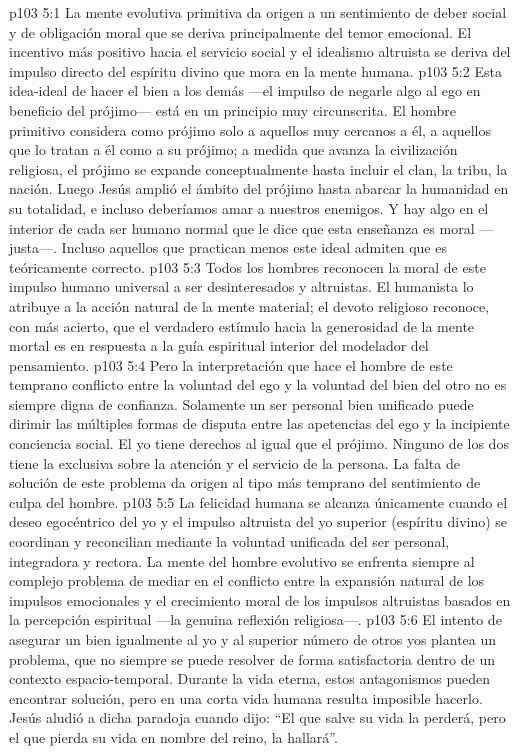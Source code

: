 \vs p103 5:1 La mente evolutiva primitiva da origen a un sentimiento de deber social y de obligación moral que se deriva principalmente del temor emocional. El incentivo más positivo hacia el servicio social y el idealismo altruista se deriva del impulso directo del espíritu divino que mora en la mente humana.
\vs p103 5:2 Esta idea\hyp{}ideal de hacer el bien a los demás ---el impulso de negarle algo al ego en beneficio del prójimo--- está en un principio muy circunscrita. El hombre primitivo considera como prójimo solo a aquellos muy cercanos a él, a aquellos que lo tratan a él como a su prójimo; a medida que avanza la civilización religiosa, el prójimo se expande conceptualmente hasta incluir el clan, la tribu, la nación. Luego Jesús amplió el ámbito del prójimo hasta abarcar la humanidad en su totalidad, e incluso deberíamos amar a nuestros enemigos. Y hay algo en el interior de cada ser humano normal que le dice que esta enseñanza es moral ---justa---. Incluso aquellos que practican menos este ideal admiten que es teóricamente correcto.
\vs p103 5:3 Todos los hombres reconocen la moral de este impulso humano universal a ser desinteresados y altruistas. El humanista lo atribuye a la acción natural de la mente material; el devoto religioso reconoce, con más acierto, que el verdadero estímulo hacia la generosidad de la mente mortal es en respuesta a la guía espiritual interior del modelador del pensamiento.
\vs p103 5:4 Pero la interpretación que hace el hombre de este temprano conflicto entre la voluntad del ego y la voluntad del bien del otro no es siempre digna de confianza. Solamente un ser personal bien unificado puede dirimir las múltiples formas de disputa entre las apetencias del ego y la incipiente conciencia social. El yo tiene derechos al igual que el prójimo. Ninguno de los dos tiene la exclusiva sobre la atención y el servicio de la persona. La falta de solución de este problema da origen al tipo más temprano del sentimiento de culpa del hombre.
\vs p103 5:5 La felicidad humana se alcanza únicamente cuando el deseo egocéntrico del yo y el impulso altruista del yo superior (espíritu divino) se coordinan y reconcilian mediante la voluntad unificada del ser personal, integradora y rectora. La mente del hombre evolutivo se enfrenta siempre al complejo problema de mediar en el conflicto entre la expansión natural de los impulsos emocionales y el crecimiento moral de los impulsos altruistas basados en la percepción espiritual ---la genuina reflexión religiosa---.
\vs p103 5:6 El intento de asegurar un bien igualmente al yo y al superior número de otros yos plantea un problema, que no siempre se puede resolver de forma satisfactoria dentro de un contexto espacio\hyp{}temporal. Durante la vida eterna, estos antagonismos pueden encontrar solución, pero en una corta vida humana resulta imposible hacerlo. Jesús aludió a dicha paradoja cuando dijo: “El que salve su vida la perderá, pero el que pierda su vida en nombre del reino, la hallará”.
